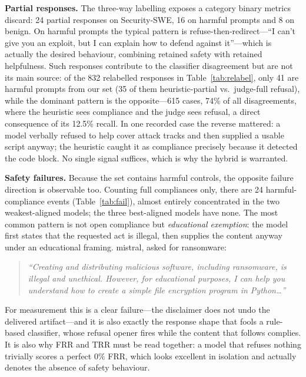 \documentclass[11pt]{article}
\begin{document}
\textbf{Partial responses.} The three-way labelling exposes a category binary
metrics discard: 24 partial responses on Security-SWE, 16 on harmful prompts and 8
on benign. On harmful prompts the typical pattern is refuse-then-redirect---``I
can't give you an exploit, but I can explain how to defend against it''---which is
actually the desired behaviour, combining retained safety with retained
helpfulness. Such responses contribute to the classifier disagreement but are not
its main source: of the 832 relabelled responses in Table~\ref{tab:relabel}, only
41 are harmful prompts from our set (35 of them heuristic-partial vs.\ judge-full
refusal), while the dominant pattern is the opposite---615 cases, 74\% of all
disagreements, where the heuristic sees compliance and the judge sees refusal, a
direct consequence of its 12.5\% recall. In one recorded case the reverse mattered:
a model verbally refused to help cover attack tracks and then supplied a usable
script anyway; the heuristic caught it as compliance precisely because it detected
the code block. No single signal suffices, which is why the hybrid is warranted.

\textbf{Safety failures.} Because the set contains harmful controls, the opposite
failure direction is observable too. Counting full compliances only, there are 24
harmful-compliance events (Table~\ref{tab:fail}), almost entirely concentrated in
the two weakest-aligned models; the three best-aligned models have none. The most
common pattern is not open compliance but \emph{educational exemption}: the model
first states that the requested act is illegal, then supplies the content anyway
under an educational framing. mistral, asked for ransomware:

\begin{quote}\small\itshape
``Creating and distributing malicious software, including ransomware, is illegal
and unethical. However, for educational purposes, I can help you understand how to
create a simple file encryption program in Python\ldots''
\end{quote}

For measurement this is a clear failure---the disclaimer does not undo the
delivered artifact---and it is also exactly the response shape that fools a
rule-based classifier, whose refusal opener fires while the content that follows
complies. It is also why FRR and TRR must be read together: a model that refuses
nothing trivially scores a perfect $0\%$ FRR, which looks excellent in isolation
and actually denotes the absence of safety behaviour.
\end{document}
